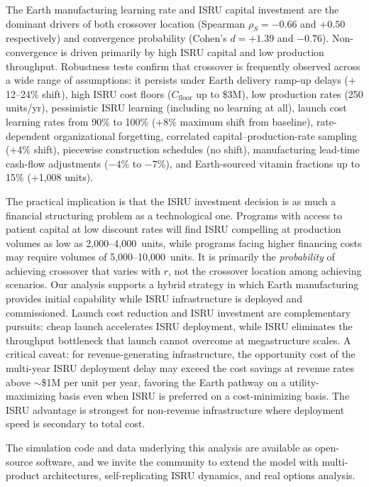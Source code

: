 \documentclass[preprint,12pt]{elsarticle}
\begin{document}
The Earth manufacturing learning rate and ISRU capital investment are the dominant drivers of both crossover location (Spearman $\rho_S = -0.66$ and $+0.50$ respectively) and convergence probability (Cohen's $d = +1.39$ and $-0.76$). Non-convergence is driven primarily by high ISRU capital and low production throughput. Robustness tests confirm that crossover is frequently observed across a wide range of assumptions: it persists under Earth delivery ramp-up delays ($+$12--24\% shift), high ISRU cost floors ($C_{\mathrm{floor}}$ up to \$3M), low production rates (250 units/yr), pessimistic ISRU learning (including no learning at all), launch cost learning rates from 90\% to 100\% ($+$8\% maximum shift from baseline), rate-dependent organizational forgetting, correlated capital--production-rate sampling ($+$4\% shift), piecewise construction schedules (no shift), manufacturing lead-time cash-flow adjustments ($-$4\% to $-$7\%), and Earth-sourced vitamin fractions up to 15\% ($+$1{,}008 units).

The practical implication is that the ISRU investment decision is as much a financial structuring problem as a technological one. Programs with access to patient capital at low discount rates will find ISRU compelling at production volumes as low as 2{,}000--4{,}000~units, while programs facing higher financing costs may require volumes of 5{,}000--10{,}000~units. It is primarily the \emph{probability} of achieving crossover that varies with $r$, not the crossover location among achieving scenarios. Our analysis supports a hybrid strategy in which Earth manufacturing provides initial capability while ISRU infrastructure is deployed and commissioned. Launch cost reduction and ISRU investment are complementary pursuits: cheap launch accelerates ISRU deployment, while ISRU eliminates the throughput bottleneck that launch cannot overcome at megastructure scales. A critical caveat: for revenue-generating infrastructure, the opportunity cost of the multi-year ISRU deployment delay may exceed the cost savings at revenue rates above ${\sim}$\$1M per unit per year, favoring the Earth pathway on a utility-maximizing basis even when ISRU is preferred on a cost-minimizing basis. The ISRU advantage is strongest for non-revenue infrastructure where deployment speed is secondary to total cost.

The simulation code and data underlying this analysis are available as open-source software, and we invite the community to extend the model with multi-product architectures, self-replicating ISRU dynamics, and real options analysis.
\end{document}
